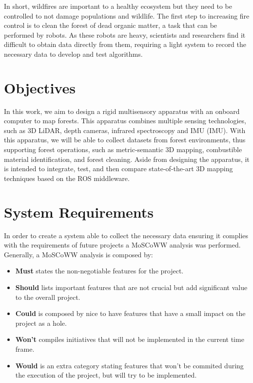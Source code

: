 In short, wildfires are important to a healthy ecosystem but they need to be controlled to not damage populations and wildlife. The first step to increasing fire control is to clean the forest of dead organic matter, a task that can be performed by robots. As these robots are heavy, scientists and researchers find it difficult to obtain data directly from them, requiring a light system to record the necessary data to develop and test algorithms.


\section{Objectives}
In this work, we aim to design a rigid multisensory apparatus with an onboard computer to map forests. This apparatus combines multiple sensing technologies, such as 3D \acs{LiDAR}, depth cameras, infrared spectroscopy and \acl{IMU} (\acs{IMU}). With this apparatus, we will be able to collect datasets from forest environments, thus supporting forest operations, such as metric-semantic 3D mapping, combustible material identification, and forest cleaning. Aside from designing the apparatus, it is intended to integrate, test, and then compare state-of-the-art 3D mapping techniques based on the ROS middleware.

\section{System Requirements}

In order to create a system able to collect the necessary data ensuring it complies with the requirements of future projects a MoSCoWW analysis was performed. Generally, a MoSCoWW analysis is composed by:

\begin{itemize}
    \item \textbf{Must} states the non-negotiable features for the project.
    \item \textbf{Should} lists important features that are not crucial but add significant value to the overall project.
    \item \textbf{Could} is composed by nice to have features that have a small impact on the project as a hole.
    \item \textbf{Won't} compiles initiatives that will not be implemented in the current time frame.
    \item \textbf{Would} is an extra category stating features that won't be commited during the execution of the project, but will try to be implemented.
\end{itemize}

